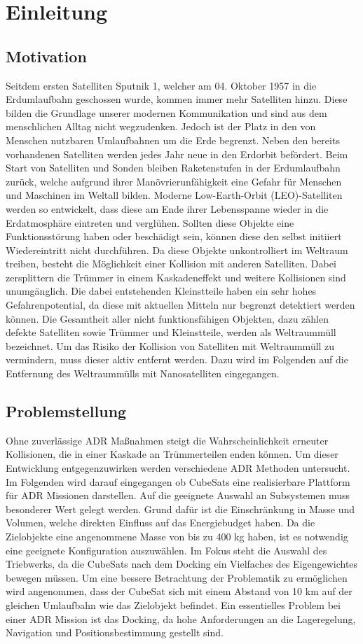 \chapter{Einleitung}
		\section{Motivation}
Seitdem ersten Satelliten Sputnik 1, welcher am 04. Oktober 1957 in die Erdumlaufbahn geschossen wurde, kommen immer mehr Satelliten hinzu. Diese bilden die Grundlage unserer modernen Kommunikation und sind aus dem menschlichen Alltag nicht wegzudenken. Jedoch ist der Platz in den von Menschen nutzbaren Umlaufbahnen um die Erde begrenzt. Neben den bereits vorhandenen Satelliten werden jedes Jahr neue in den Erdorbit befördert. Beim Start von Satelliten und Sonden bleiben Raketenstufen in der Erdumlaufbahn zurück, welche aufgrund ihrer Manövrierunfähigkeit eine Gefahr für Menschen und Maschinen im Weltall bilden. Moderne Low-Earth-Orbit (LEO)-Satelliten werden so entwickelt, dass diese am Ende ihrer Lebensspanne wieder in die Erdatmosphäre eintreten und verglühen. 
Sollten diese Objekte eine Funktionsstörung haben oder beschädigt sein, können diese den selbst initiiert Wiedereintritt nicht durchführen. Da diese Objekte unkontrolliert im Weltraum treiben, besteht die Möglichkeit einer Kollision mit anderen Satelliten. Dabei zersplittern die Trümmer in einem Kaskadeneffekt und weitere Kollisionen sind unumgänglich. Die dabei entstehenden Kleinstteile haben ein sehr hohes Gefahrenpotential, da diese mit aktuellen Mitteln nur begrenzt detektiert werden können. 
Die Gesamtheit aller nicht funktionsfähigen Objekten, dazu zählen defekte Satelliten sowie Trümmer und Kleinstteile, werden als Weltraummüll bezeichnet. Um das Risiko der Kollision von Satelliten mit Weltraummüll zu vermindern, muss dieser aktiv entfernt werden. Dazu wird im Folgenden auf die Entfernung des Weltraummülls mit Nanosatelliten eingegangen.

		\section{Problemstellung}
Ohne zuverlässige ADR Maßnahmen steigt die Wahrscheinlichkeit erneuter Kollisionen, die in einer Kaskade an Trümmerteilen enden können. Um dieser Entwicklung entgegenzuwirken werden verschiedene ADR Methoden untersucht.
Im Folgenden wird darauf eingegangen ob CubeSats eine realisierbare Plattform für ADR Missionen darstellen.
Auf die geeignete Auswahl an Subsystemen muss besonderer Wert gelegt werden. Grund dafür ist die Einschränkung in Masse und Volumen, welche direkten Einfluss auf das Energiebudget haben. 
Da die Zielobjekte eine angenommene Masse von bis zu 400 kg haben, ist es notwendig eine geeignete Konfiguration auszuwählen. Im Fokus steht die Auswahl des Triebwerks, da die CubeSats nach dem Docking ein Vielfaches des Eigengewichtes bewegen müssen. 
Um eine bessere Betrachtung der Problematik zu ermöglichen wird angenommen, dass der CubeSat sich mit einem Abstand von 10 km auf der gleichen Umlaufbahn wie das Zielobjekt befindet. Ein essentielles Problem bei einer ADR Mission ist das Docking, da hohe Anforderungen an die Lageregelung, Navigation und Positionsbestimmung gestellt sind.

